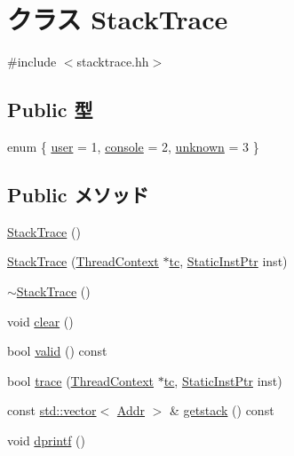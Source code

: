 \hypertarget{classAlphaISA_1_1StackTrace}{
\section{クラス StackTrace}
\label{classAlphaISA_1_1StackTrace}
}


{\ttfamily \#include $<$stacktrace.hh$>$}\subsection*{Public 型}
\begin{DoxyCompactItemize}
\item 
enum \{ \hyperlink{classAlphaISA_1_1StackTrace_a99fb83031ce9923c84392b4e92f956b5a04981b8c09a50ccfb1d92fc11b81c36a}{user} =  1, 
\hyperlink{classAlphaISA_1_1StackTrace_a99fb83031ce9923c84392b4e92f956b5a76cba6dccd6830f57b521e7dc7d0ff81}{console} =  2, 
\hyperlink{classAlphaISA_1_1StackTrace_a99fb83031ce9923c84392b4e92f956b5a5b9f6d065e6e98483b3d3ed01f4f6cbe}{unknown} =  3
 \}
\end{DoxyCompactItemize}
\subsection*{Public メソッド}
\begin{DoxyCompactItemize}
\item 
\hyperlink{classAlphaISA_1_1StackTrace_a5a9b2e3bba2262e73b20f87325efd063}{StackTrace} ()
\item 
\hyperlink{classAlphaISA_1_1StackTrace_a7c751415d8c87372fc7d24513309cf1b}{StackTrace} (\hyperlink{classThreadContext}{ThreadContext} $\ast$\hyperlink{classAlphaISA_1_1StackTrace_a4455a4759e69e5ebe68ae7298cbcc37d}{tc}, \hyperlink{classRefCountingPtr}{StaticInstPtr} inst)
\item 
\hyperlink{classAlphaISA_1_1StackTrace_adec953886bb73db4f2ec91ed12810135}{$\sim$StackTrace} ()
\item 
void \hyperlink{classAlphaISA_1_1StackTrace_ac8bb3912a3ce86b15842e79d0b421204}{clear} ()
\item 
bool \hyperlink{classAlphaISA_1_1StackTrace_a8d985300b138b6c5556ab17ed4df3b38}{valid} () const 
\item 
bool \hyperlink{classAlphaISA_1_1StackTrace_aabb136846a5e22007e44db846652ddd5}{trace} (\hyperlink{classThreadContext}{ThreadContext} $\ast$\hyperlink{classAlphaISA_1_1StackTrace_a4455a4759e69e5ebe68ae7298cbcc37d}{tc}, \hyperlink{classRefCountingPtr}{StaticInstPtr} inst)
\item 
const \hyperlink{classstd_1_1vector}{std::vector}$<$ \hyperlink{classm5_1_1params_1_1Addr}{Addr} $>$ \& \hyperlink{classAlphaISA_1_1StackTrace_aceb93ba31a3756aca859b4643efeeb46}{getstack} () const 
\item 
void \hyperlink{classAlphaISA_1_1StackTrace_a70fdc8802b54b4244889a2d3553405d5}{dprintf} ()
\end{DoxyCompactItemize}
